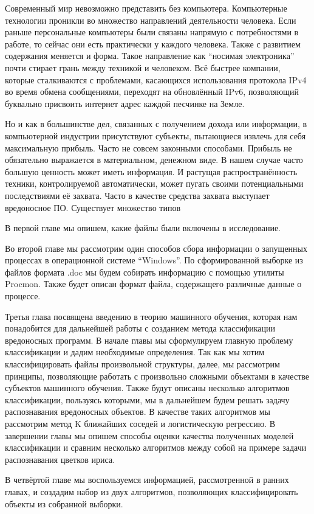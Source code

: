 
Современный мир невозможно представить без компьютера. Компьютерные технологии проникли во множество направлений деятельности человека. Если раньше персональные компьютеры были связаны напрямую с потребностями в работе, то сейчас они есть практически у каждого человека. Также с развитием содержания меняется и форма. Такое направление как “носимая электроника” почти стирает грань между техникой и человеком. Всё быстрее компании, которые сталкиваются с проблемами, касающихся использования протокола IPv4 во время обмена сообщениями, переходят на обновлённый IPv6, позволяющий буквально присвоить интернет адрес каждой песчинке на Земле.

Но и как в большинстве дел, связанных с получением дохода или информации, в компьютерной индустрии присутствуют субъекты, пытающиеся извлечь для себя максимальную прибыль. Часто не совсем законными способами. Прибыль не обязательно выражается в материальном, денежном виде. В нашем случае часто большую ценность может иметь информация. И растущая распространённость техники, контролируемой автоматически, может пугать своими потенциальными последствиями её захвата. Часто в качестве средства захвата выступает вредоносное ПО. Существует множество типов

В первой главе мы опишем, какие файлы были включены в исследование.

Во второй главе мы рассмотрим один способов сбора информации о запущенных процессах в операционной системе “Windows”.  По сформированной выборке из файлов формата .doc мы будем собирать информацию с помощью утилиты Procmon. Также будет описан формат файла, содержащего различные данные о процессе.

Третья глава посвящена введению в теорию машинного обучения, которая нам понадобится для дальнейшей работы с созданием метода классификации вредоносных программ. В начале главы мы сформулируем главную проблему классификации и дадим необходимые определения. Так как мы хотим классифицировать файлы произвольной структуры, далее, мы рассмотрим принципы, позволяющие работать с произвольно сложными объектами в качестве субъектов машинного обучения. Также будут описаны несколько алгоритмов классификации, пользуясь которыми, мы в дальнейшем будем решать задачу распознавания вредоносных объектов. В качестве таких алгоритмов мы рассмотрим метод K ближайших соседей и логистическую регрессию.  В завершении главы мы опишем способы оценки качества полученных моделей классификации и сравним несколько алгоритмов между собой на примере задачи распознавания цветков ириса.

В четвёртой главе мы воспользуемся информацией, рассмотренной в ранних главах, и создадим набор из двух алгоритмов, позволяющих классифицировать объекты из собранной выборки.




